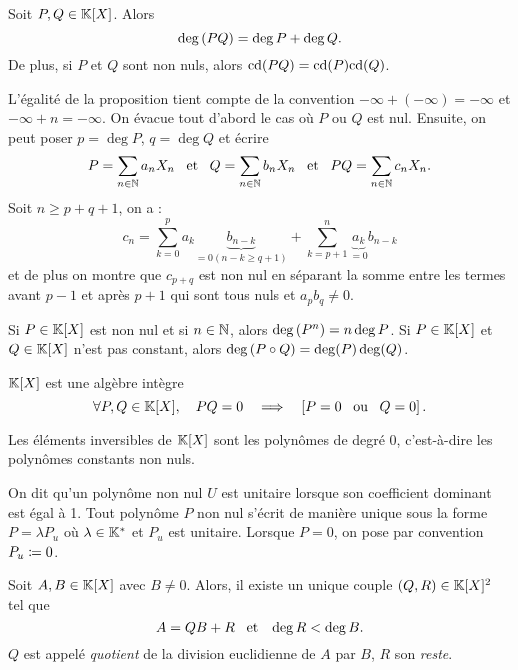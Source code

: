 \documentclass{magnolia}
\begin{document}
\begin{proposition}
Soit $P,Q\in\polyK$. Alors
\[\deg\left(PQ\right)=\deg P+\deg Q.\]
De plus, si $P$ et $Q$ sont non nuls, alors ${\rm cd}(PQ)={\rm cd}(P){\rm cd}(Q)$.
\end{proposition}

\begin{preuve}
L'égalité de la proposition tient compte de la convention $-\infty+(-\infty)=-\infty$ et $-\infty+n=-\infty$.
On évacue tout d'abord le cas où $P$ ou $Q$ est nul.
Ensuite, on peut poser $p=\deg P$, $q=\deg Q$ et écrire $$P=\sum_{n\in \mathbb{N}}a_nX_n \quad\!\text{et}\quad\!  Q=\sum_{n\in \mathbb{N}}b_nX_n \quad\!\text{et}\quad\! PQ=\sum_{n\in \mathbb{N}}c_nX_n.$$
Soit $n\geq p+q+1$, on a :
$$c_n=\sum_{k=0}^pa_k\underbrace{b_{n-k}}_{=0 (n-k\geq q+1)}+\sum_{k=p+1}^n\underbrace{a_k}_{=0}b_{n-k}$$
et de plus on montre que $c_{p+q}$ est non nul en séparant la somme entre les termes avant $p-1$ et après $p+1$ qui sont tous nuls et $a_pb_q\neq 0$.
\end{preuve}

\begin{remarques}
\remarque Si $P\in\polyK$ est non nul et si $n\in\mathbb{N}$, alors $\deg\left(P^n\right)=n\deg P$.
\remarque Si $P\in\polyK$ et $Q\in\polyK$ n'est pas constant,
  alors $\deg\left(P\circ Q\right)=\deg(P)\deg(Q)$.
\end{remarques}

\begin{proposition}
$\polyK$ est une algèbre intègre
\[\forall P,Q\in\polyK \qsep PQ=0 \quad\implique\quad \cro{P=0 \ou Q=0}.\]
\end{proposition}

\begin{proposition}
Les éléments inversibles de $\polyK$ sont les polynômes de degré 0, c'est-à-dire
les polynômes constants non nuls.
\end{proposition}

\begin{definition}
On dit qu'un polynôme non nul $U$ est unitaire lorsque son coefficient dominant est
égal à 1. Tout polynôme $P$ non nul s'écrit de manière unique sous la forme
$P=\lambda P_u$ où $\lambda\in\mathbb{K}^*$ et $P_u$ est unitaire. Lorsque $P=0$, on pose
par convention $P_u\coloneqq 0$.
\end{definition}


\begin{definition}[nom={Division euclidienne}]
  Soit $A,B\in\polyK$ avec $B\neq 0$. Alors, il existe un unique couple
  $\p{Q,R}\in\polyK^2$ tel que
  \[A=QB+R \quad\!\text{et}\quad\! \deg R<\deg B.\]
  $Q$ est appelé \emph{quotient} de la division euclidienne de $A$ par $B$, $R$ son
  \emph{reste}.
  \end{definition}
  
\end{document}
